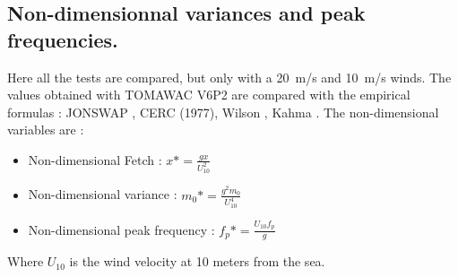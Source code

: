 \subsection{Non-dimensionnal variances and peak frequencies.}
Here all the tests are compared, but only with a 20~m/s and 10~m/s winds. The values obtained with TOMAWAC V6P2 are compared with the empirical formulas : JONSWAP \cite{Hasselmann1973}, CERC (1977)\cite {CERC77}, Wilson \cite{Wilson1965}, Kahma \cite{Kahma1992}. The non-dimensional variables are :\\
\begin{itemize}
\item Non-dimensional Fetch : $x* = \frac{g x}{U_{10}^2}$
\item Non-dimensional variance : $m_{0}* = \frac{g^2 m_{0}}{U_{10}^4}$
\item Non-dimensional peak frequency : $f_{p}* = \frac{U_{10} f_{p}}{g}$
\end{itemize}
Where $U_{10}$ is the wind velocity at 10 meters from the sea.\\
